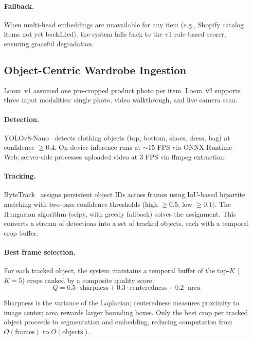 \documentclass[10pt,twocolumn]{article}
\begin{document}
\paragraph{Fallback.}
When multi-head embeddings are unavailable for any item (e.g., Shopify
catalog items not yet backfilled), the system falls back to the v1
rule-based scorer, ensuring graceful degradation.

\subsection{Object-Centric Wardrobe Ingestion}
\label{sec:ingestion}

Loom~v1 assumed one pre-cropped product photo per item.  Loom~v2 supports
three input modalities: single photo, video walkthrough, and live camera
scan.

\paragraph{Detection.}
YOLOv8-Nano~\citep{jocher2023ultralytics} detects clothing objects
(top, bottom, shoes, dress, bag) at confidence $\geq 0.4$.  On-device
inference runs at $\sim$15 FPS via ONNX Runtime Web; server-side
processes uploaded video at 3 FPS via ffmpeg extraction.

\paragraph{Tracking.}
ByteTrack~\citep{zhang2022bytetrack} assigns persistent object IDs across
frames using IoU-based bipartite matching with two-pass confidence
thresholds (high $\geq 0.5$, low $\geq 0.1$).  The Hungarian algorithm
(scipy, with greedy fallback) solves the assignment.  This converts a
stream of detections into a set of tracked objects, each with a temporal
crop buffer.

\paragraph{Best frame selection.}
For each tracked object, the system maintains a temporal buffer of the
top-$K$ ($K{=}5$) crops ranked by a composite quality score:
\begin{equation}
  Q = 0.5 \cdot \text{sharpness} + 0.3 \cdot \text{centeredness}
      + 0.2 \cdot \text{area}
\label{eq:quality}
\end{equation}

\noindent Sharpness is the variance of the Laplacian; centeredness
measures proximity to image center; area rewards larger bounding boxes.
Only the best crop per tracked object proceeds to segmentation and
embedding, reducing computation from $O(\text{frames})$ to
$O(\text{objects})$.
\end{document}
